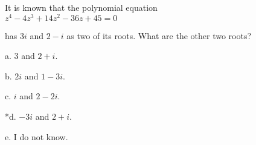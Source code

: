 
It is known that the polynomial equation\\

\(z^{4} - 4z^{3} + 14z^{2} - 36z + 45 = 0\)

has \(3i\) and \(2 - i\) as two of its roots. What are the other two roots?

a. \(3\) and \(2 + i\).

b. \(2i\) and \(1 - 3i\).

c. \(i\) and \(2 - 2i\).

*d. \(-3i\) and \(2 + i\).

e. I do not know.\\
